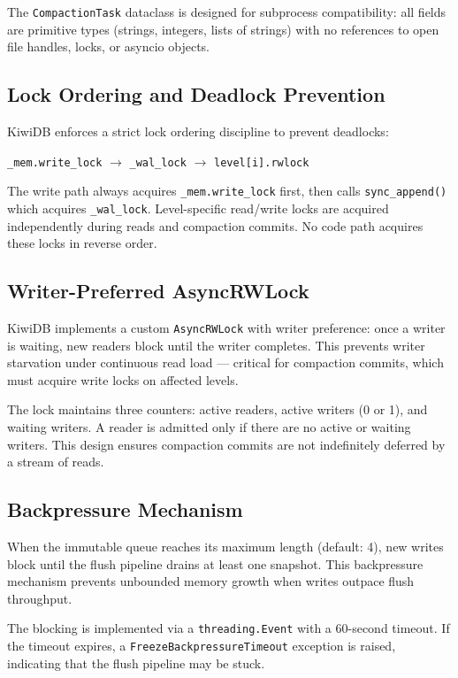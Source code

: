 \documentclass[conference]{IEEEtran}
\begin{document}
The \texttt{CompactionTask} dataclass is designed for subprocess compatibility: all fields are primitive types (strings, integers, lists of strings) with no references to open file handles, locks, or asyncio objects.

\subsection{Lock Ordering and Deadlock Prevention}

KiwiDB enforces a strict lock ordering discipline to prevent deadlocks:

\begin{center}
\texttt{\_mem.write\_lock} $\rightarrow$ \texttt{\_wal\_lock} $\rightarrow$ \texttt{level[i].rwlock}
\end{center}

The write path always acquires \texttt{\_mem.write\_lock} first, then calls \texttt{sync\_append()} which acquires \texttt{\_wal\_lock}. Level-specific read/write locks are acquired independently during reads and compaction commits. No code path acquires these locks in reverse order.

\subsection{Writer-Preferred AsyncRWLock}

KiwiDB implements a custom \texttt{AsyncRWLock} with writer preference: once a writer is waiting, new readers block until the writer completes. This prevents writer starvation under continuous read load --- critical for compaction commits, which must acquire write locks on affected levels.

The lock maintains three counters: active readers, active writers (0 or 1), and waiting writers. A reader is admitted only if there are no active or waiting writers. This design ensures compaction commits are not indefinitely deferred by a stream of reads.

\subsection{Backpressure Mechanism}

When the immutable queue reaches its maximum length (default: 4), new writes block until the flush pipeline drains at least one snapshot. This backpressure mechanism prevents unbounded memory growth when writes outpace flush throughput.

The blocking is implemented via a \texttt{threading.Event} with a 60-second timeout. If the timeout expires, a \texttt{FreezeBackpressureTimeout} exception is raised, indicating that the flush pipeline may be stuck.
\end{document}
